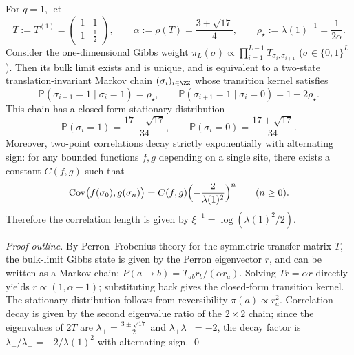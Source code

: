 \begin{proposition}[Complete solvability of the \texorpdfstring{$q=1$}{q=1} Markov chain: stationary distribution, transition kernel, and alternating correlation length]\label{prop:pom-multiplicity-composition-q1-markov}
For \(q=1\), let
\[
T:=T^{(1)}=\begin{pmatrix}1&1\\[2pt]1&\tfrac12\end{pmatrix},
\qquad
\alpha:=\rho(T)=\frac{3+\sqrt{17}}{4},
\qquad
\rho_\star:=\lambda(1)^{-1}=\frac{1}{2\alpha}.
\]
Consider the one-dimensional Gibbs weight
\(
\pi_L(\sigma)\propto \prod_{i=1}^{L-1}T_{\sigma_i,\sigma_{i+1}}
\)
(\(\sigma\in\{0,1\}^L\)).
Then its bulk limit exists and is unique, and is equivalent to a two-state translation-invariant Markov chain \((\sigma_i)_{i\in\ZZ}\) whose transition kernel satisfies
\[
\boxed{\;
\mathbb{P}(\sigma_{i+1}=1\mid\sigma_i=1)=\rho_\star,\qquad
\mathbb{P}(\sigma_{i+1}=1\mid\sigma_i=0)=1-2\rho_\star.\;}
\]
This chain has a closed-form stationary distribution
\[
\boxed{\;
\mathbb{P}(\sigma_i=1)=\frac{17-\sqrt{17}}{34},\qquad
\mathbb{P}(\sigma_i=0)=\frac{17+\sqrt{17}}{34}.\;}
\]
Moreover, two-point correlations decay strictly exponentially with alternating sign: for any bounded functions \(f,g\) depending on a single site, there exists a constant \(C(f,g)\) such that
\[
\mathrm{Cov}\bigl(f(\sigma_0),g(\sigma_n)\bigr)
=C(f,g)\Bigl(-\frac{2}{\lambda(1)^2}\Bigr)^{n}\qquad(n\ge 0).
\]
Therefore the correlation length is given by \(\xi^{-1}=\log(\lambda(1)^2/2)\).
\end{proposition}
\begin{proof}[Proof outline]
By Perron--Frobenius theory for the symmetric transfer matrix \(T\), the bulk-limit Gibbs state is given by the Perron eigenvector \(r\), and can be written as a Markov chain:
\(
P(a\to b)=T_{ab}r_b/(\alpha r_a)
\).
Solving \(Tr=\alpha r\) directly yields \(r\propto(1,\alpha-1)\); substituting back gives the closed-form transition kernel.
The stationary distribution follows from reversibility \(\pi(a)\propto r_a^2\).
Correlation decay is given by the second eigenvalue ratio of the \(2\times 2\) chain;
since the eigenvalues of \(2T\) are \(\lambda_\pm=\frac{3\pm\sqrt{17}}{2}\) and \(\lambda_+\lambda_-=-2\), the decay factor is
\(
\lambda_-/\lambda_+=-2/\lambda(1)^2
\)
with alternating sign. \qed
\end{proof}

